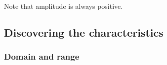 Note that amplitude is always positive.



\subsection*{Discovering the characteristics}
\subsubsection*{Domain and range}

